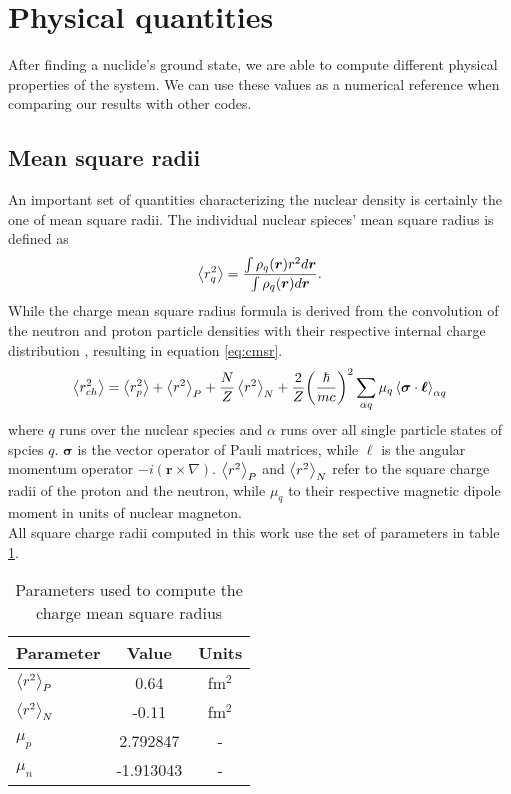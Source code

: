 \section{Physical quantities}
After finding a nuclide's ground state, we are able to compute different physical properties of the system. We can use these values as a numerical reference when comparing our results with other codes.
\subsection{Mean square radii}
An important set of quantities characterizing the nuclear density is certainly the one of mean square radii.
The individual nuclear spieces' mean square radius is defined as
\begin{equation}
    \label{eq:msr}
    \expval{r^2_q} = \frac{\int\rho_q(\bm r) r^2 d\bm r}{\int \rho_q(\bm r) d\bm r}.
\end{equation}
While the charge mean square radius formula is derived from the convolution of the neutron and proton particle densities with their respective internal charge distribution \cite{BERTOZZI1972408}, resulting in equation \ref{eq:cmsr}.
\begin{equation}
    \label{eq:cmsr}
    \expval{r^2_{ch}} = \expval{r^2_p} + \expval{r^2}_P + \frac N Z \expval{r^2}_N + \frac 2 Z \bigg(\frac{ \hbar}{mc}\bigg)^2\sum_{\alpha q}\mu_q \expval{\bm \sigma\cdot \bm {\ell}}_{\alpha q}
\end{equation}
where $q$ runs over the nuclear species and $\alpha$ runs over all single particle states of spcies $q$. $\bm \sigma$ is the vector operator of Pauli matrices, while $\bm {\ell}$ is the angular momentum operator $-i(\bm r \times \nabla)$.
$\expval{r^2}_P$ and $\expval{r^2}_N$ refer to the square charge radii of the proton and the neutron, while $\mu_q$ to their respective magnetic dipole moment in units of nuclear magneton.
\\All square charge radii computed in this work use the set of parameters in table \ref{tab:charge_par}.
\begin{table}[ht]
  \centering
  \begin{tabular}{lcc}
    \toprule
    \textbf{Parameter} & \textbf{Value} & \textbf{Units} \\
    \midrule
    $\expval{r^2}_P$ & 0.64 & fm$^2$ \\
    $\expval{r^2}_N$ & -0.11 & fm$^2$ \\
    $\mu_p$ & 2.792847 & - \\
    $\mu_n$ & -1.913043 & - \\
    \bottomrule
  \end{tabular}
  \caption{Parameters used to compute the charge mean square radius}
  \label{tab:charge_par}
\end{table}

